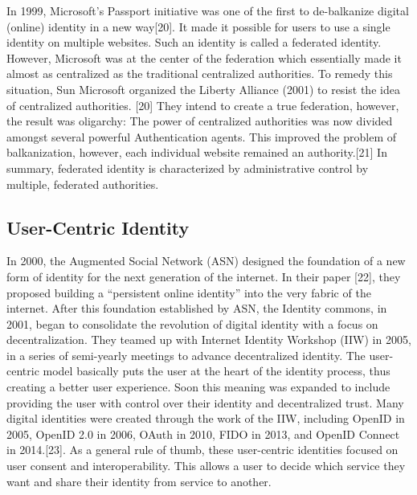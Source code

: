 In 1999, Microsoft’s Passport initiative was one of the first to de-balkanize digital (online) identity in a new way[20]. It made it possible for users to use a single identity on multiple websites. Such an identity is called a federated identity. However, Microsoft was at the center of the federation which essentially made it almost as centralized as the traditional centralized authorities. To remedy this situation, Sun Microsoft organized the Liberty Alliance (2001) to resist the idea of centralized authorities. [20] They intend to create a true federation, however, the result was oligarchy: The power of centralized authorities was now divided amongst several powerful Authentication agents. This improved the problem of balkanization, however, each individual website remained an authority.[21] In summary, federated identity is characterized by administrative control by multiple, federated authorities.

\subsection{User-Centric Identity}

In 2000, the Augmented Social Network (ASN) designed the foundation of a new form of identity for the next generation of the internet. In their paper [22], they proposed building a “persistent online identity” into the very fabric of the internet.  After this foundation established by ASN, the Identity commons, in 2001, began to consolidate the revolution of digital identity with a focus on decentralization. They teamed up with Internet Identity Workshop (IIW) in 2005, in a series of semi-yearly meetings to advance decentralized identity. The user-centric model basically puts the user at the heart of the identity process, thus creating a better user experience. Soon this meaning was expanded to include providing the user with control over their identity and decentralized trust. Many digital identities were created through the work of the IIW, including OpenID in 2005, OpenID 2.0 in 2006, OAuth in 2010, FIDO in 2013, and OpenID Connect in 2014.[23]. As a general rule of thumb, these user-centric identities focused on user consent and interoperability. This allows a user to decide which service they want and share their identity from service to another.


